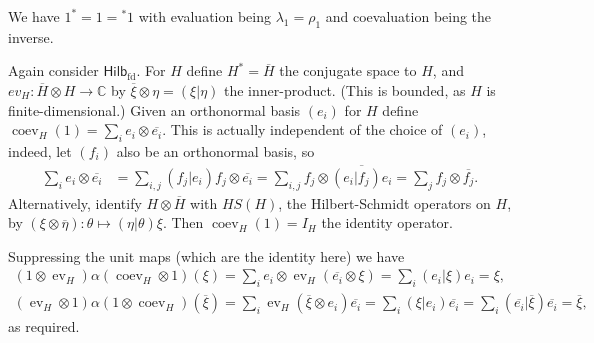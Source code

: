 \documentclass[a4paper,11pt]{article}
\theoremstyle{plain}
\theoremstyle{remark}
\newenvironment{example}
  {\pushQED{\qed}\renewcommand{\qedsymbol}{$\triangle$}\examplex}
  {\popQED\endexamplex}
\newcommand{\catHilbFD}{\textsf{Hilb}_{\text{fd}}}
\newcommand{\ev}{\operatorname{ev}}
\newcommand{\coev}{\operatorname{coev}}
\begin{document}
We have $1^*=1={}^*1$ with evaluation being $\lambda_1=\rho_1$ and coevaluation being the inverse.

\begin{example}\label{eg:hilbfd_rigid}
Again consider $\catHilbFD$.  For $H$ define $H^* = \overline{H}$ the conjugate space to $H$, and $ev_H \colon \overline H \otimes H \to \mathbb C$ by $\overline\xi\otimes\eta = (\xi|\eta)$ the inner-product.  (This is bounded, as $H$ is finite-dimensional.)  Given an orthonormal basis $(e_i)$ for $H$ define $\coev_H(1) = \sum_i e_i \otimes \overline{e_i}$.  This is actually independent of the choice of $(e_i)$, indeed, let $(f_i)$ also be an orthonormal basis, so
\begin{align*}
\sum_i e_i\otimes\overline{e_i}
&= \sum_{i,j} (f_j|e_i)f_j \otimes\overline{e_i}
= \sum_{i,j} f_j \otimes\overline{(e_i|f_j)e_i}
= \sum_j f_j \otimes \overline{f_j}.
\end{align*}
Alternatively, identify $H\otimes\overline{H}$ with $HS(H)$, the Hilbert-Schmidt operators on $H$, by $(\xi\otimes\overline\eta) \colon \theta \mapsto (\eta|\theta) \xi$.  Then $\coev_H(1) = I_H$ the identity operator.

Suppressing the unit maps (which are the identity here) we have
\begin{gather*}
(1\otimes\ev_H)\alpha(\coev_H\otimes 1)(\xi)
= \sum_i e_i \otimes \ev_H(\overline{e_i}\otimes \xi)
= \sum_i (e_i|\xi) e_i = \xi, \\
(\ev_H\otimes 1)\alpha(1\otimes\coev_H)(\overline\xi)
= \sum_i \ev_H(\overline\xi\otimes e_i) \overline{e_i}
= \sum_i (\xi|e_i) \overline{e_i}
= \sum_i (\overline{e_i}|\overline\xi) \overline{e_i}
= \overline{\xi},
\end{gather*}
as required.
\end{example}
\end{document}
